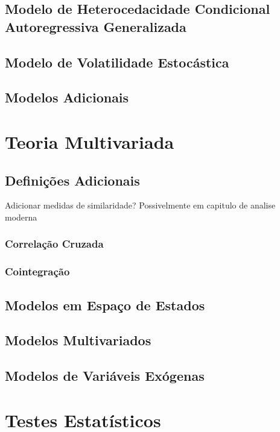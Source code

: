 \section{Modelo de Heterocedacidade Condicional Autoregressiva Generalizada}
\label{sec:garch}

\section{Modelo de Volatilidade Estocástica}

\section{Modelos Adicionais}

\chapter{Teoria Multivariada}

\section{Definições Adicionais}

Adicionar medidas de similaridade? Possivelmente em capitulo de analise
moderna

\subsection{Correlação Cruzada}

\subsection{Cointegração}

\section{Modelos em Espaço de Estados}

\section{Modelos Multivariados}

\section{Modelos de Variáveis Exógenas}

\chapter{Testes Estatísticos}

